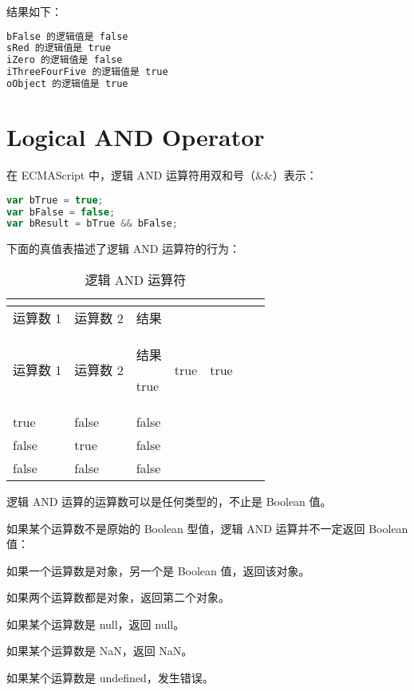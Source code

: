 结果如下：

\begin{lstlisting}[language=bash]
bFalse 的逻辑值是 false
sRed 的逻辑值是 true
iZero 的逻辑值是 false
iThreeFourFive 的逻辑值是 true
oObject 的逻辑值是 true 
\end{lstlisting}




\section{Logical AND Operator}

在 ECMAScript 中，逻辑 AND 运算符用双和号（\&\&）表示：

\begin{lstlisting}[language=JavaScript]
var bTrue = true;
var bFalse = false;
var bResult = bTrue && bFalse;
\end{lstlisting}

下面的真值表描述了逻辑 AND 运算符的行为：

\begin{longtable}{|m{120pt}|m{120pt}|m{120pt}|}
\tabularnewline\hline
运算数 1	&运算数 2	&结果
\endhead

\caption{逻辑 AND 运算符}\\
\hline
运算数 1	&运算数 2	&结果
\endfirsthead

\endfoot


\endlastfoot
\hline
true	&true	&true\\
\hline
true	&false	&false\\
\hline
false	&true	&false\\
\hline
false	&false	&false\\
\hline
\end{longtable}

逻辑 AND 运算的运算数可以是任何类型的，不止是 Boolean 值。

如果某个运算数不是原始的 Boolean 型值，逻辑 AND 运算并不一定返回 Boolean 值：

\begin{compactitem}
\item 如果一个运算数是对象，另一个是 Boolean 值，返回该对象。
\item 如果两个运算数都是对象，返回第二个对象。
\item 如果某个运算数是 null，返回 null。
\item 如果某个运算数是 NaN，返回 NaN。
\item 如果某个运算数是 undefined，发生错误。
\end{compactitem}

